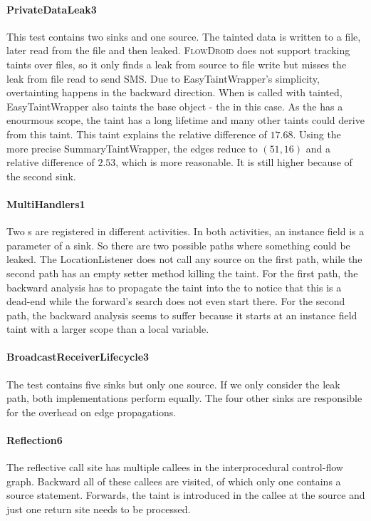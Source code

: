 \documentclass[../draft.tex]{subfiles}
\begin{document}
    \paragraph{PrivateDataLeak3} 
    This test contains two sinks and one source. 
    The tainted data is written to a file, later read from the file and then leaked. 
    \textsc{FlowDroid} does not support tracking taints over files, so it only finds a leak from source to file write but misses the leak from file read to send SMS. 
    Due to EasyTaintWrapper's simplicity, overtainting happens in the backward direction. When  is called with  tainted, EasyTaintWrapper also taints the base object - the  in this case. 
    As the  has a enourmous scope, the taint has a long lifetime and many other taints could derive from this taint. 
    This taint explains the relative difference of $17.68$.
    Using the more precise SummaryTaintWrapper, the edges reduce to $(51, 16)$ and a relative difference of $2.53$, which is more reasonable. 
    It is still higher because of the second sink. 

    \paragraph{MultiHandlers1}
    Two s are registered in different activities. 
    In both activities, an instance field is a parameter of a sink.
    So there are two possible paths where something could be leaked. 
    The LocationListener does not call any source on the first path, while the second path has an empty setter method killing the taint.
    For the first path, the backward analysis has to propagate the taint into the  to notice that this is a dead-end while the forward's search does not even start there.
    For the second path, the backward analysis seems to suffer because it starts at an instance field taint with a larger scope than a local variable.

    \paragraph{BroadcastReceiverLifecycle3}
    The test contains five sinks but only one source. 
    If we only consider the leak path, both implementations perform equally. 
    The four other sinks are responsible for the overhead on edge propagations.
    
    \paragraph{Reflection6}
    The reflective call site has multiple callees in the interprocedural control-flow graph. 
    Backward all of these callees are visited, of which only one contains a source statement. 
    Forwards, the taint is introduced in the callee at the source and just one return site needs to be processed.
\end{document}
